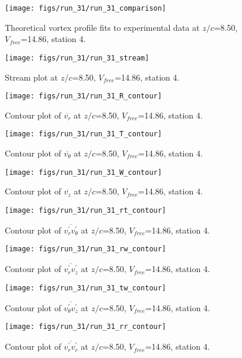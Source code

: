 \begin{figure}[H]
\centering
\texttt{[image: figs/run\_31/run\_31\_comparison]}
\caption{Theoretical vortex profile fits to experimental data at $z/c$=8.50, $V_{free}$=14.86, station 4.}
\end{figure}


\begin{figure}[H]
\centering
\texttt{[image: figs/run\_31/run\_31\_stream]}
\caption{Stream plot at $z/c$=8.50, $V_{free}$=14.86, station 4.}
\end{figure}


\begin{figure}[H]
\centering
\texttt{[image: figs/run\_31/run\_31\_R\_contour]}
\caption{Contour plot of $\overline{v_{r}}$ at $z/c$=8.50, $V_{free}$=14.86, station 4.}
\end{figure}


\begin{figure}[H]
\centering
\texttt{[image: figs/run\_31/run\_31\_T\_contour]}
\caption{Contour plot of $\overline{v_{\theta}}$ at $z/c$=8.50, $V_{free}$=14.86, station 4.}
\end{figure}


\begin{figure}[H]
\centering
\texttt{[image: figs/run\_31/run\_31\_W\_contour]}
\caption{Contour plot of $\overline{v_{z}}$ at $z/c$=8.50, $V_{free}$=14.86, station 4.}
\end{figure}


\begin{figure}[H]
\centering
\texttt{[image: figs/run\_31/run\_31\_rt\_contour]}
\caption{Contour plot of $\overline{v_{r}^{\prime} v_{\theta}^{\prime}}$ at $z/c$=8.50, $V_{free}$=14.86, station 4.}
\end{figure}


\begin{figure}[H]
\centering
\texttt{[image: figs/run\_31/run\_31\_rw\_contour]}
\caption{Contour plot of $\overline{v_{r}^{\prime} v_{z}^{\prime}}$ at $z/c$=8.50, $V_{free}$=14.86, station 4.}
\end{figure}


\begin{figure}[H]
\centering
\texttt{[image: figs/run\_31/run\_31\_tw\_contour]}
\caption{Contour plot of $\overline{v_{\theta}^{\prime} v_{z}^{\prime}}$ at $z/c$=8.50, $V_{free}$=14.86, station 4.}
\end{figure}


\begin{figure}[H]
\centering
\texttt{[image: figs/run\_31/run\_31\_rr\_contour]}
\caption{Contour plot of $\overline{v_{r}^{\prime} v_{r}^{\prime}}$ at $z/c$=8.50, $V_{free}$=14.86, station 4.}
\end{figure}


